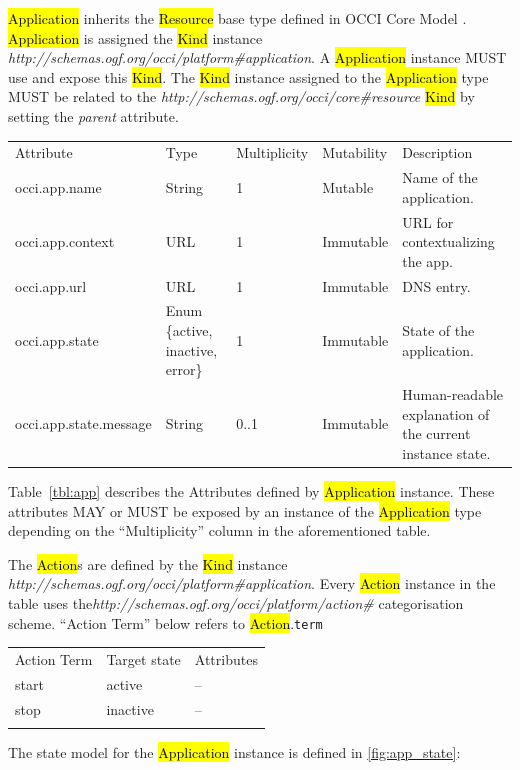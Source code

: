 \documentclass[10pt,a4paper]{article}
\begin{document}
\hl{Application} inherits the \hl{Resource} base type defined in OCCI Core Model \cite{occi:core}. \hl{Application} is assigned the \hl{Kind} instance \textit{http://schemas.ogf.org/occi/platform\#application}. A \hl{Application} instance MUST use and expose this \hl{Kind}. The \hl{Kind} instance assigned to the \hl{Application} type MUST be related to the \textit{http://schemas.ogf.org/occi/core\#resource} \hl{Kind} by setting the \textit{parent} attribute.

{
	\begin{tabular}{lp{2.5cm}p{1cm}lp{5cm}}
	\toprule
	Attribute&Type&Multi\-plicity&Mutability&Description\\
	\colrule
	occi.app.name & String & 1 & Mutable & Name of the application.\\
	occi.app.context & URL & 1 & Immutable & URL for contextualizing the app.\\
	occi.app.url & URL & 1 & Immutable & DNS entry.\\
	occi.app.state & Enum \{active, inactive, error\} & 1 & Immutable & State of the application.\\
	occi.app.state.message & String & 0..1 & Immutable & Human-readable explanation of the current instance state.
	\botrule
	\end{tabular}
}

Table~\ref{tbl:app} describes the Attributes defined by \hl{Application} instance. These attributes MAY or MUST be exposed by an instance of the \hl{Application} type depending on the ``Multiplicity'' column in the aforementioned table.

The \hl{Action}s are defined by the \hl{Kind} instance \textit{http://schemas.ogf.org/occi/platform\#application}. Every \hl{Action} instance in the table uses the\textit{http://schemas.ogf.org/occi/platform/action\#} categorisation scheme. ``Action Term'' below refers to \hl{Action}.{\tt term}

{
	\begin{tabular}{lll}
	\toprule
	Action Term & Target state & Attributes \\
	\colrule
	start & active & -- \\
	stop & inactive & -- \\
	\botrule
	\end{tabular}
}

The state model for the \hl{Application} instance is defined in \ref{fig:app_state}:
\end{document}
